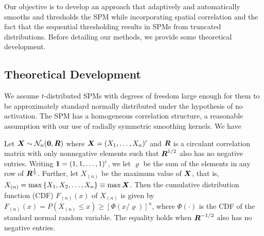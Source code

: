 Our objective is to develop an approach
that adaptively and automatically smooths and thresholds the SPM while
incorporating spatial correlation and the fact that the
sequential thresholding results in SPMs from truncated
distributions. Before detailing  our methods, we provide  some
theoretical development.   
\begin{comment}
while also having a smoothing
sequence 

By assuming this, the spatial structure is ignore and even though activated regions seems to reasonable the presence of this spatial structure will be notice. To address the issues under spatial structure we derived the distribution of the maximum of normal random variables with correlated structure, ${\bf X} \sim N_m(\bmu,{\bf R})$, where ${\bf X} = (X_1,\ldots,X_m)'$.  
\end{comment}
\subsection{Theoretical Development}
\label{method:theory}
We assume $t$-distributed SPMs with degrees of
freedom large enough for them to be approximately standard normally
distributed under the hypothesis of no activation. The SPM 
has a homogeneous correlation structure, a reasonable
assumption with our use of radially 
symmetric smoothing kernels. %
We have  
\begin{theorem}
\label{theo:evt}
  Let ${\boldsymbol{X}} \sim \mathcal N_n(\boldsymbol{0},{\boldsymbol{R}})$ where $\boldsymbol{X} =
(X_1,\ldots,X_n)'$ and ${\boldsymbol{R}}$ is a circulant correlation
matrix with only nonnegative elements such that $\boldsymbol{R}^{1/2}$ also has
no negative entries. Writing $\boldsymbol{1} = (1,1,\ldots,1)'$, we
let $\varrho$ be the sum 
of the elements in any row of ${\boldsymbol{R}}^{\frac12}$. Further, let
$X_{(n)}$ be the maximum value of ${\boldsymbol{X}}$, that is, $X_{(n)} =
\max{\{X_1,X_2,\ldots,X_n\}}\equiv\max\boldsymbol{X}$. Then  the cumulative distribution
function (CDF) $F_{(n)}(x)$ of $X_{(n)}$ is given by $F_{(n)}(x) = P(X_{(n)} \leq
x)\geq %
[\Phi(x/\varrho)]^n$, where
$\Phi(\cdot)$ is the CDF of the
standard normal random variable. The equality holds when
$\boldsymbol{R}^{-1/2}$ also has no negative entries.
\end{theorem}

